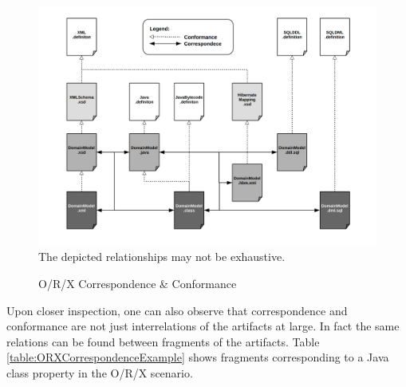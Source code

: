 \documentclass[runningheads,a4paper]{llncs}
\begin{document}
\begin{figure}[h!]
\centering
\includegraphics[width=\textwidth]{orx-correspondence-big-picture.png}
\\The depicted relationships may not be exhaustive.
\caption{O/R/X Correspondence \& Conformance}
\label{figure:ORXCorrespondenceBigPicture}
\end{figure}

Upon closer inspection, one can also observe that correspondence and conformance are not just interrelations of the artifacts at large.
In fact the same relations can be found between fragments of the artifacts.
Table \ref{table:ORXCorrespondenceExample} shows fragments corresponding to a Java class property in the O/R/X scenario.

\begin{table}[h!]
\newline
\caption{Corresponding Fragments in an O/R/X Scenario}
\label{table:ORXCorrespondenceExample}
\end{table}
\end{document}
